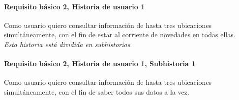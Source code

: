 \documentclass[../ei103948-project-documentation.tex]{subfiles}
\begin{document}
				\paragraph{Requisito básico 2, Historia de usuario 1}
				Como usuario quiero consultar información de hasta tres ubicaciones simultáneamente, con el fin de estar al corriente de novedades en todas ellas.\\
				\textit{Esta historia está dividida en subhistorias}.

					\paragraph*{Requisito básico 2, Historia de usuario 1, Subhistoria 1}
					Como usuario quiero consultar información de hasta tres ubicaciones simultáneamente, con el fin de saber todos sus datos a la vez.
\end{document}
